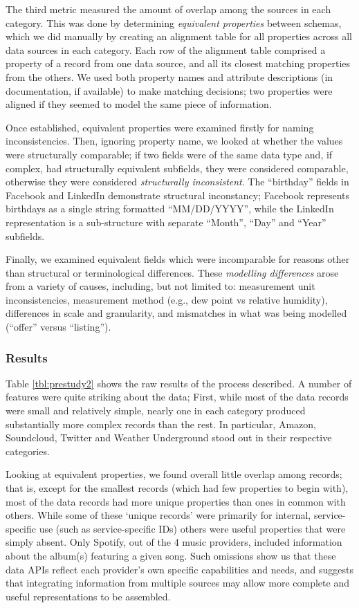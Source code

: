 \documentclass{sigchi}
\begin{document}
The third metric measured the amount of overlap among the sources in each category.  This was done by determining \emph{equivalent properties} between schemas, which we did manually by creating an alignment table for all properties across all data sources in each category.  Each row of the alignment table comprised a property of a record from one data source, and all its closest matching properties from the others.  We used both property names and attribute descriptions (in documentation, if available) to make matching decisions; two properties were aligned if they seemed to model the same piece of information.

Once established, equivalent properties were examined firstly for naming inconsistencies.  Then, ignoring property name, we looked at whether the values were structurally comparable; if two fields were of the same data type and, if complex, had structurally equivalent subfields, they were considered comparable, otherwise they were considered \emph{structurally inconsistent}.  The ``birthday'' fields in Facebook and LinkedIn demonstrate structural inconstancy; Facebook represents birthdays as a single string formatted ``MM/DD/YYYY'', while the LinkedIn representation is a sub-structure with separate ``Month'', ``Day'' and ``Year'' subfields.

Finally, we examined equivalent fields which were incomparable for reasons other than structural or terminological differences.  These \emph{modelling differences} arose from a variety of causes, including, but not limited to: measurement unit inconsistencies, measurement method (e.g., dew point vs relative humidity), differences in scale and granularity, and mismatches in what was being modelled (``offer'' versus ``listing'').

\subsubsection{Results}
Table \ref{tbl:prestudy2} shows the raw results of the process described.  A number of features were quite striking about the data; First, while most of the data records were small and relatively simple, nearly one in each category produced substantially more complex records than the rest. In particular, Amazon, Soundcloud, Twitter and Weather Underground stood out in their respective categories.

Looking at equivalent properties, we found overall little overlap among records; that is, except for the smallest records (which had few properties to begin with), most of the data records had more unique properties than ones in common with others.  While some of these `unique records' were primarily for internal, service-specific use (such as service-specific IDs) others were useful properties that were simply absent.  Only Spotify, out of the 4 music providers, included information about the album(s) featuring a given song.  Such omissions show us that these data APIs reflect each provider's own specific capabilities and needs, and suggests that integrating information from multiple sources may allow more complete and useful representations to be assembled.
\end{document}
